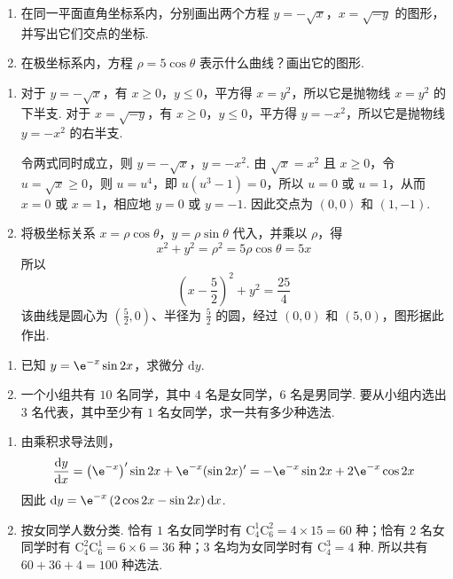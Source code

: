 \documentclass[UTF8,a4paper,oneside,11pt]{ctexbook}
\begin{document}
\begin{problem}
\begin{enumerate}
\item 在同一平面直角坐标系内，分别画出两个方程 \(y = -\sqrt{x}\)，\(x = \sqrt{-y}\) 的图形，并写出它们交点的坐标.
\item 在极坐标系内，方程 \(\rho = 5\cos \theta\) 表示什么曲线？画出它的图形.
\end{enumerate}

\begin{solution}
\begin{enumerate}
\item 对于 \(y=-\sqrt{x}\)，有 \(x\geqslant0\)，\(y\leqslant0\)，平方得 \(x=y^{2}\)，所以它是抛物线 \(x=y^{2}\) 的下半支. 对于 \(x=\sqrt{-y}\)，有 \(x\geqslant0\)，\(y\leqslant0\)，平方得 \(y=-x^{2}\)，所以它是抛物线 \(y=-x^{2}\) 的右半支.

令两式同时成立，则 \(y=-\sqrt{x}\)，\(y=-x^{2}\). 由 \(\sqrt{x}=x^{2}\) 且 \(x\geqslant0\)，令 \(u=\sqrt{x}\geqslant0\)，则 \(u=u^{4}\)，即 \(u(u^{3}-1)=0\)，所以 \(u=0\) 或 \(u=1\)，从而 \(x=0\) 或 \(x=1\)，相应地 \(y=0\) 或 \(y=-1\). 因此交点为 \((0,0)\) 和 \((1,-1)\).
\item 将极坐标关系 \(x=\rho\cos\theta\)，\(y=\rho\sin\theta\) 代入，并乘以 \(\rho\)，得
\[
x^{2}+y^{2}=\rho^{2}=5\rho\cos\theta=5x
\]
所以
\[
\left(x-\frac{5}{2}\right)^{2}+y^{2}=\frac{25}{4}
\]
该曲线是圆心为 \(\left(\frac{5}{2},0\right)\)、半径为 \(\frac{5}{2}\) 的圆，经过 \((0,0)\) 和 \((5,0)\)，图形据此作出.
\end{enumerate}
\end{solution}
\end{problem}

\begin{problem}
\begin{enumerate}
\item 已知 \(y = \e^{-x}\sin 2x\)，求微分 \(\mathrm{d}y\).
\item 一个小组共有 \(10\) 名同学，其中 \(4\) 名是女同学，\(6\) 名是男同学. 要从小组内选出 \(3\) 名代表，其中至少有 \(1\) 名女同学，求一共有多少种选法.
\end{enumerate}

\begin{solution}
\begin{enumerate}
\item 由乘积求导法则，
\[
\frac{\mathrm{d}y}{\mathrm{d}x}=\left(\e^{-x}\right)'\sin 2x+\e^{-x}(\sin 2x)'=-\e^{-x}\sin 2x+2\e^{-x}\cos 2x
\]
因此 \(\mathrm{d}y=\e^{-x}\left(2\cos 2x-\sin 2x\right)\mathrm{d}x\).
\item 按女同学人数分类. 恰有 \(1\) 名女同学时有 \(\mathrm C_{4}^{1}\mathrm C_{6}^{2}=4\times15=60\) 种；恰有 \(2\) 名女同学时有 \(\mathrm C_{4}^{2}\mathrm C_{6}^{1}=6\times6=36\) 种；\(3\) 名均为女同学时有 \(\mathrm C_{4}^{3}=4\) 种. 所以共有 \(60+36+4=100\) 种选法.
\end{enumerate}
\end{solution}
\end{problem}
\end{document}
